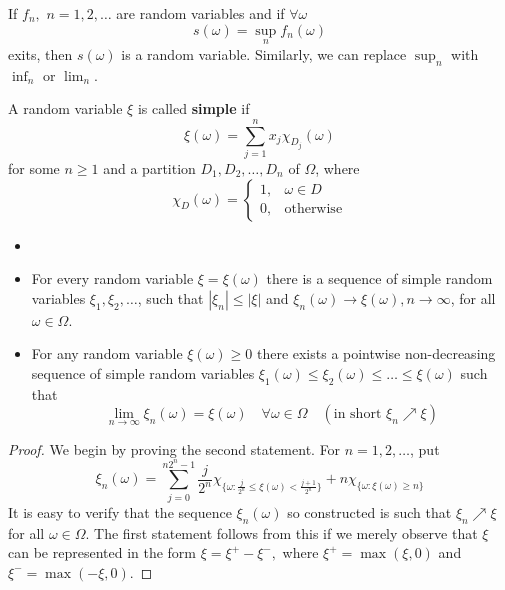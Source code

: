 \begin{lemma}
If $f_n,$ $n = 1,2, \dots$ are random variables and if $\forall \omega$  $$s(\omega) = \sup_n f_n(\omega)$$
exits, then $s(\omega)$ is a random variable. Similarly, we can replace $\sup_n$ with $\inf_n$ or $\lim_n$.
\end{lemma}

\begin{definition}
A random variable $\xi$ is called \textbf{simple} if 
\begin{equation*}
    \xi(\omega) = \sum_{j=1}^n x_j \chi_{D_j}(\omega)
\end{equation*}
for some $n \ge 1$ and a partition $D_1, D_2, \dots, D_n$ of $\Omega$, where
\begin{equation*}
    \chi_D(\omega) = 
    \begin{cases}
     1, & \omega \in D\\
     0, & \text{otherwise}
    \end{cases}
\end{equation*}
\end{definition}
\begin{lemma}
\begin{itemize}
    \item[]
    \item For every random variable $\xi = \xi(\omega)$ there is a sequence of simple random variables $\xi_1, \xi_2, \dots$, such that $|\xi_n| \le |\xi|$ and $\xi_n(\omega) \rightarrow \xi(\omega), n \rightarrow \infty$, for all $\omega \in \Omega$.
    \item For any random variable $\xi(\omega) \ge 0$ there exists a pointwise non-decreasing sequence of simple random variables $\xi_1(\omega) \le \xi_2(\omega) \le \dots \le \xi(\omega)$ such that 
    \begin{equation*}
        \lim_{n \rightarrow \infty} \xi_n(\omega) = \xi(\omega) \quad \forall \omega \in \Omega \quad (\text{in short }\xi_n\nearrow\xi)
    \end{equation*}
\end{itemize}
\end{lemma}
\begin{proof}
We begin by proving the second statement. For $n=1,2,\dots$, put 
\begin{equation*}
    \xi_n(\omega) = \sum_{j=0}^{n2^n-1} \frac{j}{2^n}\chi_{ \big\{\omega: \frac{j}{2^n} \le \xi(\omega)< \frac{j+1}{2^n}  \big\}} + n \chi_{\{\omega: \xi(\omega)\ge n \}}
\end{equation*}
It is easy to verify that the sequence $\xi_n(\omega)$ so constructed is such that $\xi_n\nearrow\xi$ for all $\omega \in \Omega$. The first statement follows from this if we merely observe that $\xi$ can be represented in the form $\xi = \xi^+ - \xi^-,$ where $\xi^+ = \max(\xi,0)$ and $\xi^-= \max(-\xi,0).$
\end{proof}

